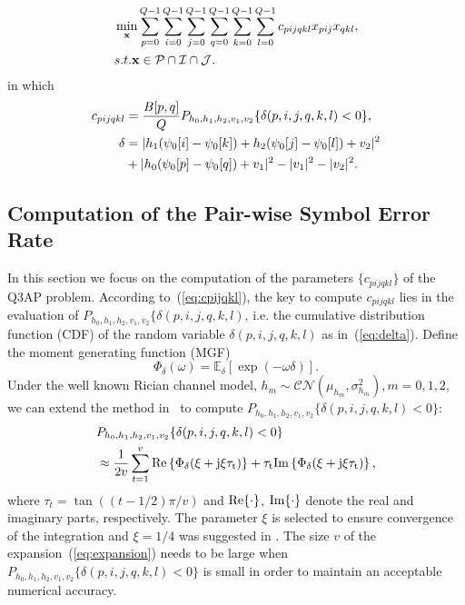 \documentclass[journal]{IEEEtran}
\renewcommand{\Re}{\rm Re}
\renewcommand{\Im}{\rm Im}
\begin{document}
\begin{align}
    & \min_{\mathbf{x}}\sum_{p=0}^{Q-1}\sum_{i=0}^{Q-1}\sum_{j=0}^{Q-1}
    \sum_{q=0}^{Q-1}\sum_{k=0}^{Q-1}\sum_{l=0}^{Q-1}c_{pijqkl}x_{pij}x_{qkl},
    \label{eq:Q3AP}\\
    & \mbox{s.t. } \mathbf{x}\in \mathcal{P}\cap\mathcal{I}\cap\mathcal{J}.
    \notag
\end{align}
in which
\begin{align}
    c_{pijqkl} & = \frac{B[p, q]}{Q}P_{h_0,h_1,h_2,v_1,v_2}\{\delta(p,i,j,q,k,l)
    < 0\},
    \label{eq:cpijqkl} \\
    \delta & = |h_1(\psi_0[i] - \psi_0[k])+h_2(\psi_0[j] - \psi_0[l])+v_2|^2 
 \notag
    \\
    &
       + |h_0(\psi_0[p] - \psi_0[q]) + v_1|^2 - |v_1|^2 -
    |v_2|^2.\label{eq:delta_pijqkl}
\end{align}

\subsection{Computation of the Pair-wise Symbol Error Rate}

In this section we focus on the computation of the parameters $\{c_{pijqkl}\}$
of the Q3AP problem. According to~(\ref{eq:cpijqkl}), the key to compute
$c_{pijqkl}$ lies in the evaluation of
$P_{h_0,h_1,h_2,v_1,v_2}\{\delta(p,i,j,q,k,l)$, i.e. the cumulative distribution
function (CDF) of the random variable $\delta(p,i,j,q,k,l)$ as
in~(\ref{eq:delta}). Define the moment generating function (MGF)
\[\Phi_{\delta}(\omega) = \mathbb{E}_{\delta}[\exp(-\omega\delta)].\]
Under the well known Rician channel model, 
$h_m\sim\mathcal{CN}(\mu_{h_m},\sigma_{h_m}^2), m=0,1,2$, we 
can extend the method
in~\cite{harvind2005symbol, taricco2002exact} to compute
$P_{h_0,h_1,h_2,v_1,v_2}\{\delta(p,i,j,q,k,l) < 0\}$:
\begin{align}
    & P_{h_0,h_1,h_2,v_1,v_2}\{\delta(p,i,j,q,k,l) < 0\} \notag \\
    & \approx \frac{1}{2v}\sum_{t=1}^v \Re\left\{\Phi_{\delta}(\xi +
    j\xi\tau_t)\right\} + \tau_t\Im\left\{\Phi_{\delta}(\xi +
    j\xi\tau_t)\right\},
    \label{eq:expansion}
\end{align}
where $\tau_t = \tan((t- 1/2)\pi/v)$
and $\Re\{\cdot\}$, $\Im\{\cdot\}$ denote the real and imaginary parts,
respectively. 
The parameter $\xi$ is selected to ensure convergence of the
integration and $\xi = 1/4$ was suggested in \cite{taricco2002exact}. The
size $v$ of the expansion~(\ref{eq:expansion}) needs to be large when $
P_{h_0,h_1,h_2,v_1,v_2}\{\delta(p,i,j,q,k,l) < 0\}$ is small in order to
maintain an acceptable numerical accuracy.
\end{document}

